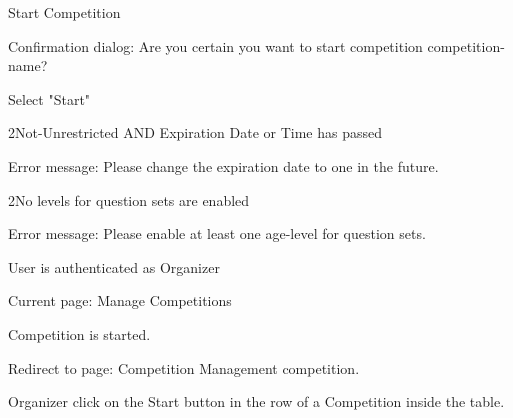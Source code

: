 
\begin{uc}{Start Competition}

    \begin{uc-mss}
    \item Confirmation dialog: Are you certain you want to start competition {competition-
    name}?
    \item Select "Start"
    \end{uc-mss}

    \begin{uc-ext}

        \begin{uc-fail}{2}{Not-Unrestricted AND Expiration Date or Time has passed}
        \item Error message: Please change the expiration date to one in the future.
        \end{uc-fail}

		\begin{uc-fail}{2}{No levels for question sets are enabled}
        \item Error message: Please enable at least one age-level for question sets.
        \end{uc-fail}

    \end{uc-ext}

    \begin{uc-pre}
    \item User is authenticated as Organizer
    \item Current page: Manage Competitions
    \end{uc-pre}

    \begin{uc-post}
    \item Competition is started.
    \item Redirect to page: Competition Management {competition}.
    \end{uc-post}

    \begin{uc-trig}
        Organizer click on the Start button in the row of a Competition inside the
        table.
    \end{uc-trig}

\end{uc}
